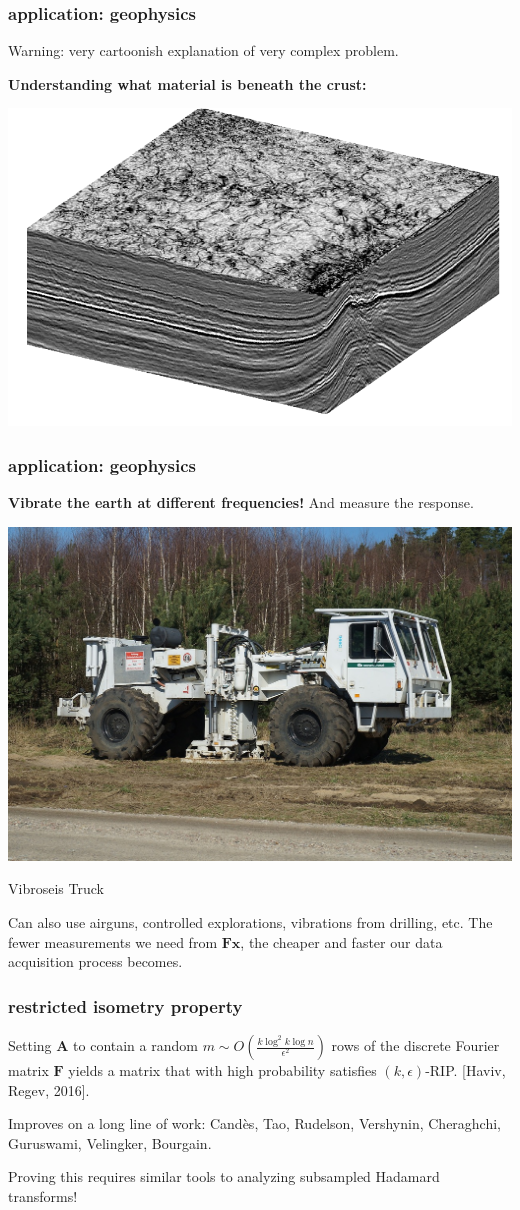 \documentclass[compress]{beamer}
\newcommand{\bv}[1]{\mathbf{#1}}
\begin{document}
\begin{frame}
	\frametitle{application: geophysics}
	\begin{center}
		\alert{Warning: very cartoonish explanation of very complex problem.}
	\end{center}
	\textbf{Understanding what material is beneath the crust:}
	\begin{center}
		\includegraphics[width=.4\textwidth]{cube.png}
	\end{center}
\end{frame}

\begin{frame}
	\frametitle{application: geophysics}
	\begin{center}
		\textbf{Vibrate the earth at different frequencies!} And measure the response.
		
		\includegraphics[width=.4\textwidth]{vibroseis.jpg}
		
		Vibroseis Truck
	\end{center}
	
	Can also use airguns, controlled explorations, vibrations from drilling, etc. The fewer measurements we need from $\bv{F}\bv{x}$, the cheaper and faster our data acquisition process becomes. 
\end{frame}



\begin{frame}
	\frametitle{restricted isometry property}
	Setting $\bv{A}$ to contain a random $m \sim O\left(\frac{k \log^2 k \log n}{\epsilon^2}\right)$ rows of the discrete Fourier matrix $\bv{F}$ yields a matrix that with high probability satisfies $(k,\epsilon)$-RIP. [Haviv, Regev, 2016]. 
	
	Improves on a long line of work: Cand\`{e}s, Tao, Rudelson, Vershynin, Cheraghchi, Guruswami, Velingker, Bourgain.
	
	\begin{center}
		Proving this requires similar tools to analyzing subsampled Hadamard transforms!
	\end{center}
\end{frame}
\end{document}
